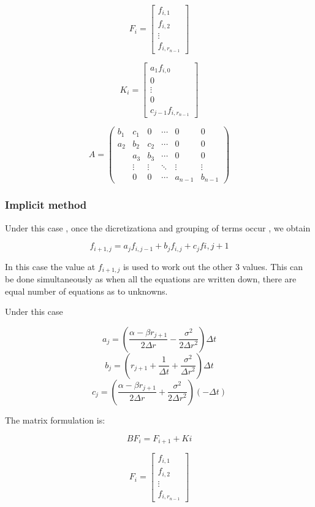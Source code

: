 \documentclass[12pt,a4paper]{article}
\begin{document}
$$F_{i}= \begin{bmatrix}
			f_{i,1} \\
			f_{i,2} \\
			\vdots \\
			f_{i,r_{n-1}}
		\end{bmatrix}
$$
     
$$K_{i}= \begin{bmatrix}
			a_{1}f_{i,0} \\
			0 \\
			\vdots \\
			0 \\
			c_{j-1}f_{i, r_{n-1}}
		\end{bmatrix}  $$
		
		
$$ A= \left( \begin{array}{cccccc}
b_{1} & c_{1} & 0 & \cdots  & 0 & 0\\
a_{2} & b_{2} & c_{2} &\cdots & 0 & 0 \\
 & a_{3} & b_{3} & \cdots & 0 & 0  \\
 & \vdots &\vdots & \ddots & \vdots & \vdots \\ 
 & 0 & 0 & \cdots & a_{n-1} & b_{n-1} \end{array} \right) $$
 
 
 
\subsubsection{ Implicit method}

Under this case , once the dicretizationa and grouping of terms occur , we obtain

$$f_{i+1,j}= a_{j}f_{i,j-1}+b_{j}f_{i,j}+c_{j}f{i,j+1} $$

In this case the value at $f_{i+1,j}$ is used to work out the other 3 values. This can be done simultaneously as when all the equations are written down, there are equal number of equations as to unknowns.


Under this case

$$a_{j}= (\frac{\alpha-\beta r_{j+1}}{2\Delta r} - \frac{\sigma^2}{2\Delta r^2})\Delta t$$ 
$$b_{j}= (r_{j+1}+\frac{1}{\Delta t} + \frac{\sigma^2}{\Delta r ^2})\Delta t$$
$$c_{j}= (\frac{\alpha-\beta r_{j+1}}{2\Delta r} + \frac{\sigma^2}{2\Delta r^2})(-\Delta t) $$

The matrix formulation is:

$$ BF_{i}= F_{i+1}+K{i}$$


$$F_{i}= \begin{bmatrix}
f_{i,1} \\
f_{i,2} \\
\vdots \\
f_{i,r_{n-1}}
\end{bmatrix}
$$
\end{document}

